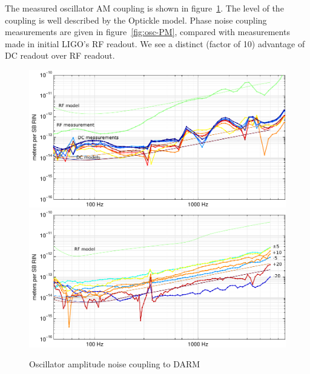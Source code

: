 The measured oscillator AM coupling is shown in
figure~\ref{fig:osc-AM}.  The level of the coupling is well described
by the Optickle model.  Phase noise coupling measurements are given in
figure~\ref{fig:osc-PM}, compared with measurements made in initial
LIGO's RF readout\cite{Smith2005Oscillator}.  We see a distinct
(factor of 10) advantage of DC readout over RF readout.

\begin{figure} %
\includegraphics[]{figures/oscAM-L1.pdf}
\includegraphics[]{figures/oscAM-H1.pdf}
\caption[Oscillator amplitude noise coupling (measured and modeled)]{\label{fig:osc-AM}Oscillator amplitude noise coupling to DARM}
\end{figure}

